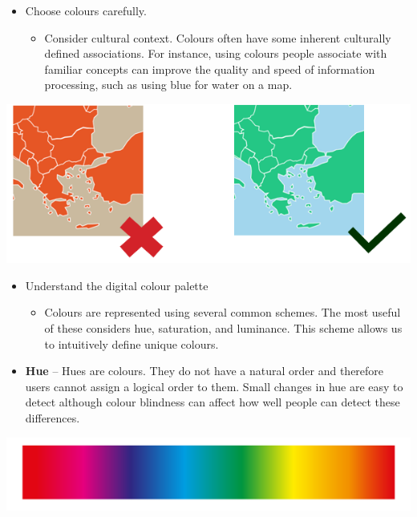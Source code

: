 \documentclass[
]{book}
\providecommand{\tightlist}{%
  \setlength{\itemsep}{0pt}\setlength{\parskip}{0pt}}
\begin{document}
\begin{itemize}
\item
  Choose colours carefully.

  \begin{itemize}
  \tightlist
  \item
    Consider cultural context. Colours often have some inherent culturally defined associations. For instance, using colours people associate with familiar concepts can improve the quality and speed of information processing, such as using blue for water on a map.
  \end{itemize}
\end{itemize}

\includegraphics[width=1\linewidth]{img/cultural_context}

\begin{itemize}
\item
  Understand the digital colour palette

  \begin{itemize}
  \tightlist
  \item
    Colours are represented using several common schemes. The most useful of these considers hue, saturation, and luminance. This scheme allows us to intuitively define unique colours.
  \end{itemize}
\item
  \textbf{Hue} -- Hues are colours. They do not have a natural order and therefore users cannot assign a logical order to them. Small changes in hue are easy to detect although colour blindness can affect how well people can detect these differences.
\end{itemize}

\includegraphics[width=1\linewidth]{img/visegs/eghue}
\end{document}
